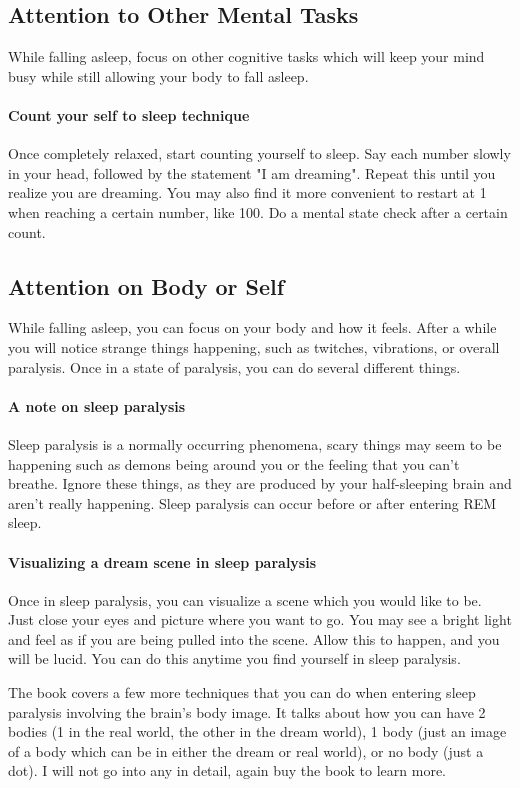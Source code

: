 \documentclass{article}
\begin{document}
\subsection{Attention to Other Mental Tasks}
While falling asleep, focus on other cognitive tasks which will keep your mind busy while still allowing your body to fall asleep. 

\paragraph{Count your self to sleep technique}
Once completely relaxed, start counting yourself to sleep. Say each number slowly in your head, followed by the statement "I am dreaming". Repeat this until you realize you are dreaming. You may also find it more convenient to restart at 1 when reaching a certain number, like 100. Do a mental state check after a certain count. 

\subsection{Attention on Body or Self}
While falling asleep, you can focus on your body and how it feels. After a while you will notice strange things happening, such as twitches, vibrations, or overall paralysis. Once in a state of paralysis, you can do several different things.

\paragraph{A note on sleep paralysis} Sleep paralysis is a normally occurring phenomena, scary things may seem to be happening such as demons being around you or the feeling that you can't breathe. Ignore these things, as they are produced by your half-sleeping brain and aren't really happening. Sleep paralysis can occur before or after entering REM sleep.

\paragraph{Visualizing a dream scene in sleep paralysis} Once in sleep paralysis, you can visualize a scene which you would like to be. Just close your eyes and picture where you want to go. You may see a bright light and feel as if you are being pulled into the scene. Allow this to happen, and you will be lucid. You can do this anytime you find yourself in sleep paralysis. 

\bigskip\noindent
The book covers a few more techniques that you can do when entering sleep paralysis involving the brain's body image. It talks about how you can have 2 bodies (1 in the real world, the other in the dream world), 1 body (just an image of a body which can be in either the dream or real world), or no body (just a dot). I will not go into any in detail, again buy the book to learn more. 
\end{document}
